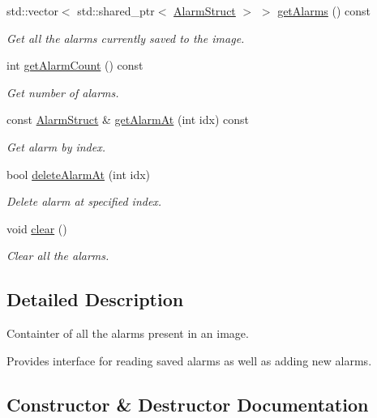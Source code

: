 \begin{DoxyCompactItemize}
std\+::vector$<$ std\+::shared\+\_\+ptr$<$ \hyperlink{structwtl_1_1_alarm_struct}{Alarm\+Struct} $>$ $>$ \hyperlink{classwtl_1_1_alarms_a1e4f5043ef627b8544229890fc88097e}{get\+Alarms} () const
\begin{DoxyCompactList}\small\item\em Get all the alarms currently saved to the image. \end{DoxyCompactList}\item 
int \hyperlink{classwtl_1_1_alarms_a35140892038d14ec3304d4fc8bfadd85}{get\+Alarm\+Count} () const
\begin{DoxyCompactList}\small\item\em Get number of alarms. \end{DoxyCompactList}\item 
const \hyperlink{structwtl_1_1_alarm_struct}{Alarm\+Struct} \& \hyperlink{classwtl_1_1_alarms_aea1ae385de429cb375351e28873b0c3c}{get\+Alarm\+At} (int idx) const
\begin{DoxyCompactList}\small\item\em Get alarm by index. \end{DoxyCompactList}\item 
bool \hyperlink{classwtl_1_1_alarms_a96edd28f3fa545d44afc773480391be6}{delete\+Alarm\+At} (int idx)
\begin{DoxyCompactList}\small\item\em Delete alarm at specified index. \end{DoxyCompactList}\item 
void \hyperlink{classwtl_1_1_alarms_aaaa6b43ef25ae43721fa107bf2797895}{clear} ()
\begin{DoxyCompactList}\small\item\em Clear all the alarms. \end{DoxyCompactList}\end{DoxyCompactItemize}


\subsection{Detailed Description}
Containter of all the alarms present in an image. 

Provides interface for reading saved alarms as well as adding new alarms. 

\subsection{Constructor \& Destructor Documentation}
\mbox{\label{classwtl_1_1_alarms_a4dfc7136cef92ed082180b489066ff27}} 
